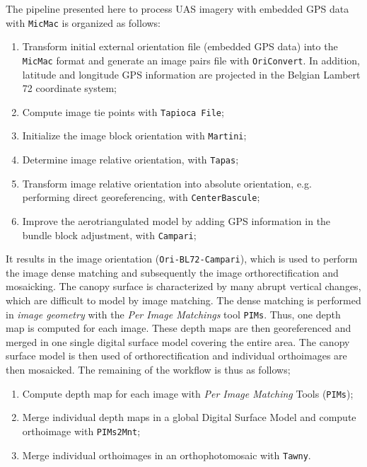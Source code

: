 The pipeline presented here to process UAS imagery with embedded GPS data with {\tt MicMac} is organized as follows:
\vspace{\baselineskip}
\begin{enumerate}
 \setlength{\itemsep}{0pt}
  \setlength{\parskip}{0pt}
\item Transform initial external orientation file (embedded GPS data) into the {\tt MicMac} format and generate an image pairs file with {\tt OriConvert}. 
In addition, latitude and longitude GPS information are projected in the Belgian Lambert 72 coordinate system;
\item Compute image tie points with {\tt Tapioca File};
\item Initialize the image block orientation with {\tt Martini};
\item Determine image relative orientation, with {\tt Tapas};
\item Transform image relative orientation into absolute orientation, e.g. performing direct georeferencing, with {\tt CenterBascule};
\item Improve the aerotriangulated model by adding GPS information in the bundle block adjustment, with {\tt Campari};
\end{enumerate}
\vspace{-0.8\topsep}
It results in the image orientation ({\tt Ori-BL72-Campari}), which is used to perform the image dense matching and subsequently the image orthorectification and mosaicking.
The canopy surface is characterized by many abrupt vertical changes, which are difficult to model by image matching. 
The dense matching is performed in \textit{image geometry} with the \textit{Per Image Matchings} tool {\tt PIMs}. 
Thus, one depth map is computed for each image. 
These depth maps are then georeferenced and merged in one single digital surface model covering the entire area.
The canopy surface model is then used of orthorectification and individual orthoimages are then mosaicked.
The remaining of the workflow is thus as follows;
\vspace{-0.8\topsep}
\begin{enumerate}\addtocounter{enumi}{6}
 \setlength{\itemsep}{0pt}
  \setlength{\parskip}{0pt}
\item Compute depth map for each image with \textit{Per Image Matching} Tools ({\tt PIMs});
\item Merge individual depth maps in a global Digital Surface Model  and compute orthoimage with {\tt PIMs2Mnt};
\item Merge individual orthoimages in an orthophotomosaic with {\tt Tawny}.
\end{enumerate}
\vspace{-0.8\topsep}

